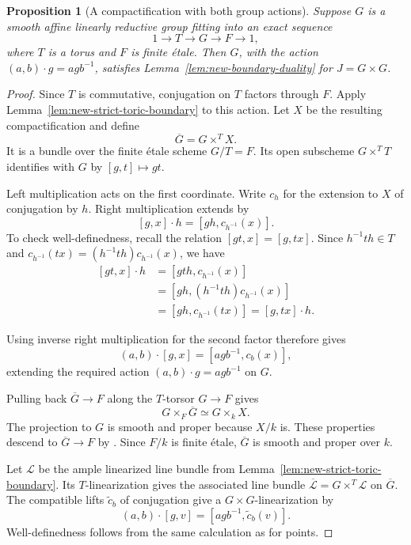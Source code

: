 \documentclass[11pt,reqno]{amsart}
\newtheorem{proposition}[theorem]{Proposition}
\theoremstyle{definition}
\theoremstyle{remark}
\theoremstyle{plain}
\numberwithin{equation}{section}
\begin{document}
\begin{proposition}[A compactification with both group actions]
\label{prop:new-torus-finite-compactification}
Suppose \(G\) is a smooth affine linearly reductive group fitting into
an exact sequence
\[
 1\longrightarrow T\longrightarrow G\longrightarrow F\longrightarrow1,
\]
where \(T\) is a torus and \(F\) is finite \'{e}tale.
Then \(G\), with the action \((a,b)\cdot g=agb^{-1}\), satisfies
Lemma~\ref{lem:new-boundary-duality} for \(J=G\times G\).
\end{proposition}
\begin{proof}
Since \(T\) is commutative, conjugation on \(T\) factors through \(F\).
Apply Lemma~\ref{lem:new-strict-toric-boundary} to this action.
Let \(X\) be the resulting compactification and define
\[
 \overline G=G\times^T X.
\]
It is a bundle over the finite \'{e}tale scheme \(G/T=F\).
Its open subscheme \(G\times^T T\) identifies with \(G\) by
\([g,t]\mapsto gt\).

Left multiplication acts on the first coordinate.
Write \(c_h\) for the extension to \(X\) of conjugation by \(h\).
Right multiplication extends by
\[
 [g,x]\cdot h=[gh,c_{h^{-1}}(x)].
\]
To check well-definedness, recall the relation \([gt,x]=[g,tx]\).
Since \(h^{-1}th\in T\) and
\(c_{h^{-1}}(tx)=(h^{-1}th)c_{h^{-1}}(x)\), we have
\[
 \begin{aligned}
 {[gt,x]}\cdot h
 &=[gth,c_{h^{-1}}(x)]\\
 &=[gh,(h^{-1}th)c_{h^{-1}}(x)]\\
 &=[gh,c_{h^{-1}}(tx)]=[g,tx]\cdot h.
 \end{aligned}
\]

Using inverse right multiplication for the second factor therefore gives
\[
 (a,b)\cdot[g,x]=[agb^{-1},c_b(x)],
\]
extending the required action \((a,b)\cdot g=agb^{-1}\) on \(G\).

Pulling back \(\overline G\to F\) along the \(T\)-torsor \(G\to F\) gives
\[
 G\times_F\overline G\simeq G\times_kX.
\]
The projection to \(G\) is smooth and proper because \(X/k\) is.
These properties descend to \(\overline G\to F\)
by \cite[Tag~02YJ]{Stacks}.
Since \(F/k\) is finite \'{e}tale, \(\overline G\) is smooth and proper over \(k\).

Let \(\mathcal L\) be the ample linearized line bundle from
Lemma~\ref{lem:new-strict-toric-boundary}.
Its \(T\)-linearization gives the associated line bundle
\(\overline{\mathcal L}=G\times^T\mathcal L\) on \(\overline G\).
The compatible lifts \(\widetilde c_b\) of conjugation give a
\(G\times G\)-linearization by
\[
 (a,b)\cdot[g,v]=[agb^{-1},\widetilde c_b(v)].
\]
Well-definedness follows from the same calculation as for points.


\end{proof}
\end{document}
